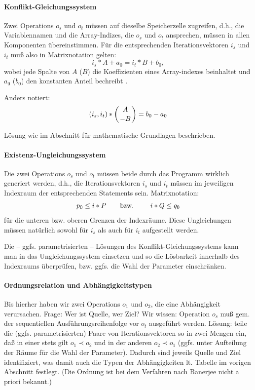 \paragraph{Konflikt-Gleichungssystem}

Zwei Operations $o_s$ und $o_t$ müssen auf dieselbe Speicherzelle
zugreifen, d.h., die Variablennamen und die Array-Indizes, die $o_s$ und
$o_t$ ansprechen, müssen in allen Komponenten übereinstimmen. Für die
entsprechenden Iterationsvektoren $i_s$ und $i_t$ muß also in
Matrixnotation gelten:
$$i_s * A + a_0 = i_t * B + b_0,$$ wobei jede Spalte von $A$ ($B$) die
Koeffizienten eines Array-indexes beinhaltet und $a_0$ ($b_0$) den
konstanten Anteil bechreibt \cite{Ban93}.

Anders notiert: $$(i_s, i_t) * \left( {A \atop -B} \right) = b_0-a_0$$

Lösung wie im Abschnitt für mathematische Grundlagen
beschrieben.

\paragraph{Existenz-Ungleichungssystem}

Die zwei Operations $o_s$ und $o_t$ müssen beide durch das Programm
wirklich generiert werden, d.h., die Iterationsvektoren $i_s$ und $i_t$
müssen im jeweiligen Indexraum der entsprechenden Statements
sein. Matrixnotation: $$p_0 \leq i * P \hbox{\qquad bzw. \qquad} i*Q \leq
q_0$$ für die unteren bzw. oberen Grenzen der Indexräume. Diese
Ungleichungen müssen natürlich sowohl für $i_s$ als auch für $i_t$
aufgestellt werden.

Die -- ggfs. parametrisierten -- Lösungen des Konflikt-Gleichungssystems
kann man in das Ungleichungssystem einsetzen und so die Lösbarkeit
innerhalb des Indexraums überprüfen, bzw. ggfs. die Wahl der Parameter
einschränken.

\paragraph{Ordnungsrelation und Abhängigkeitstypen}

Bis hierher haben wir zwei Operations $o_1$ und $o_2$, die eine
Abhängigkeit verursachen. Frage: Wer ist Quelle, wer Ziel?  Wir wissen:
Operation $o_s$ muß gem.  der sequentiellen Ausführungsreihenfolge vor
$o_t$ ausgeführt werden. Lösung: teile die (ggfs. parametrisierten)
Paare von Iterationsvektoren so in zwei Mengen ein, daß in einer stets
gilt $o_1 \prec o_2$ und in der anderen $o_2 \prec o_1$ (ggfs. unter
Aufteilung der Räume für die Wahl der Parameter). Dadurch sind jeweils
Quelle und Ziel identifiziert, was damit auch die Typen der
Abhängigkeiten lt. Tabelle im vorigen Abschnitt festlegt. (Die Ordnung ist bei dem Verfahren nach Banerjee nicht a priori bekannt.)

